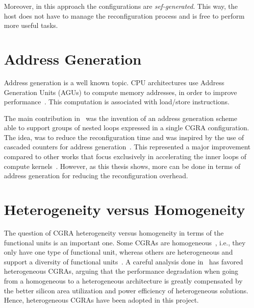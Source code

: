 Moreover, in this approach the configurations are {\em
  sef-generated}. This way, the host does not have to manage the
reconfiguration process and is free to perform more useful tasks.


\section{Address Generation}
\label{section:addressGenerator}

Address generation is a well known topic. CPU architectures use
Address Generation Units (AGUs) to compute memory addresses, in order
to improve
performance~\cite{van2006address,wijeratne20079,cormie2002arm11}.
This computation is associated with load/store instructions.

The main contribution in~\cite{deSousa12} was the invention of an
address generation scheme able to support groups of nested loops
expressed in a single CGRA configuration. The idea, was to reduce the
reconfiguration time and was inspired by the use of cascaded counters
for address generation~\cite{Carta06}. This represented a major
improvement compared to other works that focus exclusively in
accelerating the inner loops of compute kernels~\cite{deSutter10}.
However, as this thesis shows, more can be done in terms of address
generation for reducing the reconfiguration overhead.


\section{Heterogeneity versus Homogeneity}
\label{section:heterogeneityVsHomogeneity}

The question of CGRA heterogeneity versus homogeneity in terms of the
functional units is an important one. Some CGRAs are
homogeneous~\cite{Ebeling96}, i.e., they only have one type of
functional unit, whereas others are heterogeneous and support a
diversity of functional units~\cite{Heysters03}. A careful analysis
done in~\cite{Park12} has favored heterogeneous CGRAs, arguing that
the performance degradation when going from a homogeneous to a
heterogeneous architecture is greatly compensated by the better
silicon area utilization and power efficiency of heterogeneous
solutions. Hence, heterogeneous CGRAs have been adopted in this
project.


